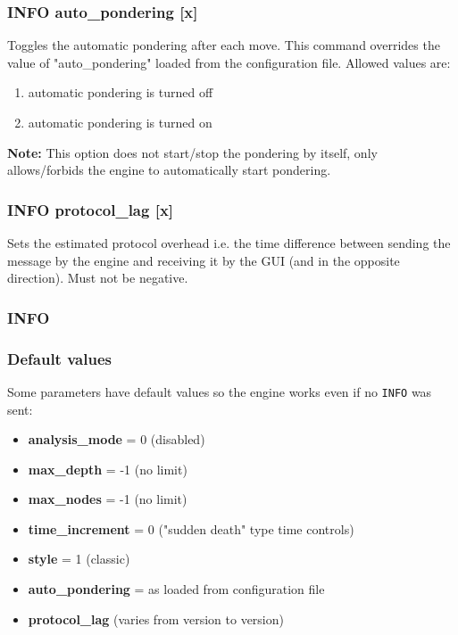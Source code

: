 \documentclass[12pt,a4paper]{article}
\begin{document}
\subsubsection{INFO auto{\_}pondering [x]}
Toggles the automatic pondering after each move. This command overrides the value of "auto{\_}pondering" loaded from the configuration file. Allowed values are:
\begin{enumerate}[leftmargin=7.5em]
	\item[\text{$[x]=0$}]{automatic pondering is turned off}
	\item[\text{$[x]=1$}]{automatic pondering is turned on}
\end{enumerate}

\textbf{Note:} This option does not start/stop the pondering by itself, only allows/forbids the engine to automatically start pondering.

\subsubsection{INFO protocol{\_}lag [x]}
Sets the estimated protocol overhead i.e. the time difference between sending the message by the engine and receiving it by the GUI (and in the opposite direction). Must not be negative.

\subsubsection{INFO }

\subsubsection{Default values}
Some parameters have default values so the engine works even if no \texttt{INFO} was sent:
\begin{itemize}
\item{\textbf{analysis{\_}mode} = 0 (disabled)}
\item{\textbf{max{\_}depth } = -1 (no limit)}
\item{\textbf{max{\_}nodes} = -1 (no limit)}
\item{\textbf{time{\_}increment} = 0 ("sudden death" \cite{suddendeath} type time controls)}
\item{\textbf{style} = 1 (classic)}
\item{\textbf{auto{\_}pondering} = as loaded from configuration file}
\item{\textbf{protocol{\_}lag}  (varies from version to version)}
\end{itemize}
\end{document}
